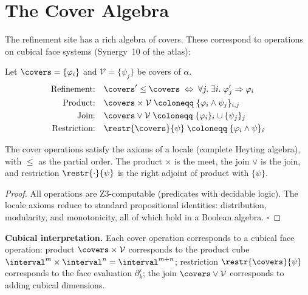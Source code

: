 \section{The Cover Algebra}
\label{sec:cover-algebra}

The refinement site has a rich algebra of covers.  These correspond
to operations on cubical face systems (Synergy~10 of the atlas):

\begin{definition}
Let \(\covers = \{\varphi_i\}\) and \(\mathcal{V} = \{\psi_j\}\)
be covers of \(\alpha\).
\begin{align*}
  \text{Refinement:}\quad
  &\covers' \leq \covers
  \;\Leftrightarrow\;
  \forall j.\; \exists i.\; \varphi'_j \Rightarrow \varphi_i \\
  \text{Product:}\quad
  &\covers \times \mathcal{V}
  \;\coloneqq\; \{\varphi_i \wedge \psi_j\}_{i,j} \\
  \text{Join:}\quad
  &\covers \vee \mathcal{V}
  \;\coloneqq\; \{\varphi_i\}_i \cup \{\psi_j\}_j \\
  \text{Restriction:}\quad
  &\restr{\covers}{\psi}
  \;\coloneqq\; \{\varphi_i \wedge \psi\}_i
\end{align*}
\end{definition}

\begin{proposition}
The cover operations satisfy the axioms of a locale (complete
Heyting algebra), with \(\leq\) as the partial order.
The product \(\times\) is the meet, the join \(\vee\) is the join,
and restriction \(\restr{\cdot}{\psi}\) is the right adjoint
of product with \(\{\psi\}\).
\end{proposition}

\begin{proof}
All operations are Z3-computable (predicates with decidable logic).
The locale axioms reduce to standard propositional identities:
distribution, modularity, and monotonicity, all of which hold
in a Boolean algebra.  \hfill\(\square\)
\end{proof}

\textbf{Cubical interpretation.}
Each cover operation corresponds to a cubical face operation:
product \(\covers \times \mathcal{V}\) corresponds to the product
cube \(\interval^m \times \interval^n = \interval^{m+n}\);
restriction \(\restr{\covers}{\psi}\) corresponds to the face
evaluation \(\partial^\varepsilon_k\); the join \(\covers \vee \mathcal{V}\)
corresponds to adding cubical dimensions.

